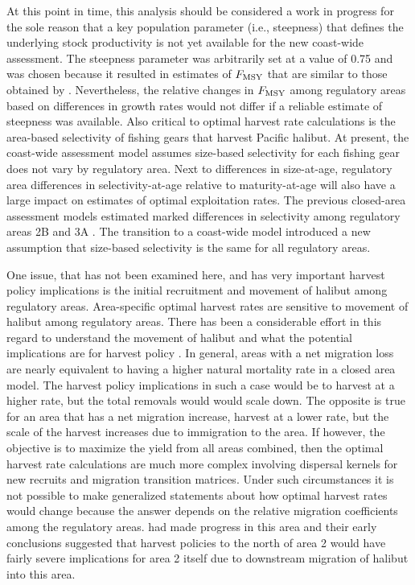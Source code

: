 At this point in time, this analysis should be considered a work in progress for the sole reason that a key population parameter (i.e., steepness) that defines the underlying stock productivity is not yet available for the new coast-wide assessment.  The steepness parameter was arbitrarily set at a value of 0.75 and was chosen because it resulted in estimates of $F_{\rm{MSY}}$ that are similar to those obtained by \cite{clark2006assessment}.  Nevertheless, the relative changes in $F_{\rm{MSY}}$ among regulatory areas based on differences in growth rates would not differ if a reliable estimate of steepness was available.  Also critical to optimal harvest rate calculations is the area-based selectivity of fishing gears that harvest Pacific halibut.  At present, the coast-wide assessment model assumes size-based selectivity for each fishing gear does not vary by regulatory area.  Next to differences in size-at-age, regulatory area differences in selectivity-at-age relative to maturity-at-age will also have a large impact on estimates of optimal exploitation rates.  The previous closed-area assessment models estimated marked differences in selectivity among regulatory areas 2B and 3A \citep{clark2006assessment}. The transition to a coast-wide model introduced a new assumption that size-based selectivity is the same for all regulatory areas.

 One issue, that has not been examined here, and has very important harvest policy implications is the initial recruitment and movement of halibut among regulatory areas. Area-specific optimal harvest rates are sensitive to movement of halibut among regulatory areas.  There has been a considerable effort in this regard to understand the movement of halibut \citep[e.g.,][]{loher2006seasonal,webster2009analysis} and what the potential implications are for harvest policy \citep{valero2009exploring,valero2010effect}.  In general, areas with a net migration loss are nearly equivalent to having a higher natural mortality rate in a closed area model.  The harvest policy implications in such a case would be to harvest at a higher rate, but the total removals would would scale down.  The opposite is true for an area that has a net migration increase, harvest at a lower rate, but the scale of the harvest increases due to immigration to the area.  If however, the objective is to maximize the yield from all areas combined, then the optimal harvest rate calculations are much more complex involving dispersal kernels for new recruits and migration transition matrices.  Under such circumstances it is not possible to make generalized statements about how optimal harvest rates would change because the answer depends on the relative migration coefficients among the regulatory areas.  \cite{valero2010effect} had made progress in this area and their early conclusions suggested that harvest policies to the north of area 2 would have fairly severe implications for area 2 itself due to downstream migration of halibut into this area.


